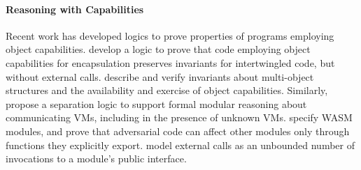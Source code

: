 

\paragraph{Reasoning with Capabilities}
 Recent work has developed logics to prove properties of programs employing object capabilities.
\citet{ddd} develop a logic to prove that code employing object
capabilities for encapsulation preserves invariants for
intertwingled code, but without external calls. 
\citet{dd}
describe and verify invariants
about multi-object structures and the availability and exercise of object capabilities.  %
Similarly,
\citet{vmsl-pldi2023} propose a separation logic to support formal modular reasoning about communicating VMs, including in the presence of unknown VMs.
\citet{irisWasm23} specify WASM modules, %
and prove that adversarial code can affect other modules only through functions they explicitly export. 
\citet{CassezFQ24} model external calls as an unbounded number of invocations to a module's public interface.
 
